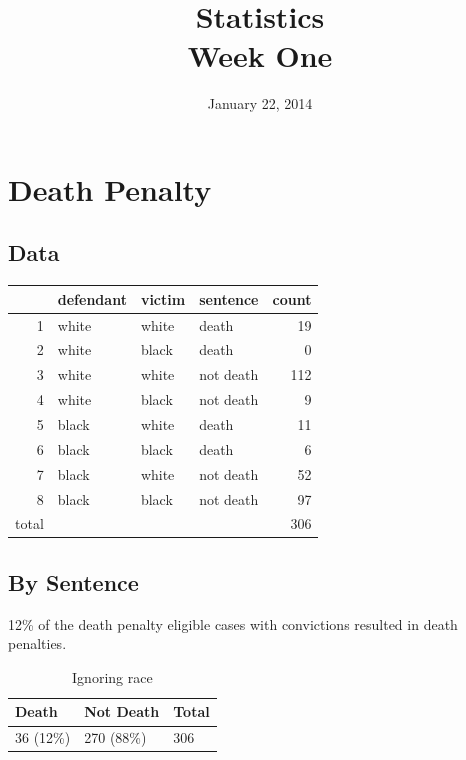 \documentclass{exam}
\author{}
\date{January 22, 2014}
\title{Statistics \\ Week One}
\begin{document}
  \maketitle
  \section{Death Penalty}
  
  \subsection{Data}
  \begin{table}[ht]
  \centering
  \begin{tabular}{rlllr}
    \toprule
          & defendant & victim & sentence  & count \\
    \midrule
    1     & white & white & death     & 19 \\
    2     & white & black & death     & 0 \\
    3     & white & white & not death & 112 \\
    4     & white & black & not death & 9 \\
    5     & black & white & death     & 11 \\
    6     & black & black & death     & 6 \\
    7     & black & white & not death & 52 \\
    8     & black & black & not death & 97 \\
    \midrule
    total &       &       &           & 306 \\
    \bottomrule
  \end{tabular}
  \end{table}

  \subsection{By Sentence}

  12\% of the death penalty eligible cases with convictions resulted in death penalties.

  \begin{table}[H]
    \centering
    \begin{tabular}{lll}
      \toprule
      Death     & Not Death  & Total \\
      \midrule
      36 (12\%) & 270 (88\%) & 306 \\
       \bottomrule
    \end{tabular}
    \caption{Ignoring race}
  \end{table}
\end{document}

